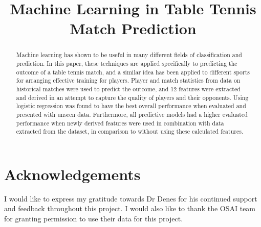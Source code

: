 \documentclass[conference]{IEEEtran}
\title{Machine Learning in Table Tennis Match Prediction}
\author{\IEEEauthorblockN{Sophie Chiang}}
\begin{document}
\maketitle
\thispagestyle{plain}
\pagestyle{plain}

\begin{abstract}
Machine learning has shown to be useful in many different fields of classification and prediction. In this paper, these techniques are applied specifically to predicting the outcome of a table tennis match, and a similar idea has been applied to different sports for arranging effective training for players. Player and match statistics from data on historical matches were used to predict the outcome, and 12 features were extracted and derived in an attempt to capture the quality of players and their opponents. Using logistic regression was found to have the best overall performance when evaluated and presented with unseen data. Furthermore, all predictive models had a higher evaluated performance when newly derived features were used in combination with data extracted from the dataset, in comparison to without using these calculated features.
\end{abstract}











\section*{Acknowledgements}
I would like to express my gratitude towards Dr Denes for his continued support and feedback throughout this project. I would also like to thank the OSAI team for granting permission to use their data for this project.



\end{document}
